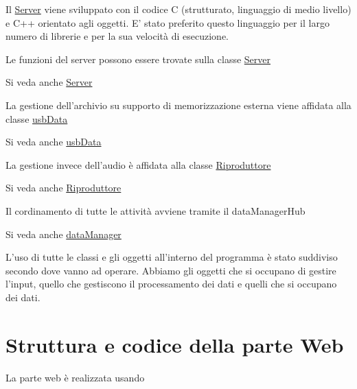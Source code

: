 \-Il \hyperlink{classServer}{\-Server} viene sviluppato con il codice \-C (strutturato, linguaggio di medio livello) e \-C++ orientato agli oggetti. \-E' stato preferito questo linguaggio per il largo numero di librerie e per la sua velocità di esecuzione.
\begin{DoxyItemize}
\item \-Le funzioni del server possono essere trovate sulla classe \hyperlink{classServer}{\-Server} \begin{DoxySeeAlso}{\-Si veda anche}
\hyperlink{classServer}{\-Server}
\end{DoxySeeAlso}

\item \-La gestione dell'archivio su supporto di memorizzazione esterna viene affidata alla classe \hyperlink{classusbData}{usb\-Data} \begin{DoxySeeAlso}{\-Si veda anche}
\hyperlink{classusbData}{usb\-Data}
\end{DoxySeeAlso}

\item \-La gestione invece dell'audio è affidata alla classe \hyperlink{classRiproduttore}{\-Riproduttore} \begin{DoxySeeAlso}{\-Si veda anche}
\hyperlink{classRiproduttore}{\-Riproduttore}
\end{DoxySeeAlso}

\item \-Il cordinamento di tutte le attività avviene tramite il data\-Manager\-Hub \begin{DoxySeeAlso}{\-Si veda anche}
\hyperlink{classdataManager}{data\-Manager}
\end{DoxySeeAlso}
\-L'uso di tutte le classi e gli oggetti all'interno del programma è stato suddiviso secondo dove vanno ad operare. \-Abbiamo gli oggetti che si occupano di gestire l'input, quello che gestiscono il processamento dei dati e quelli che si occupano dei dati.  \par
 
\end{DoxyItemize}\hypertarget{index_webStruct}{}\section{\-Struttura e codice della parte Web}\label{index_webStruct}
\-La parte web è realizzata usando
